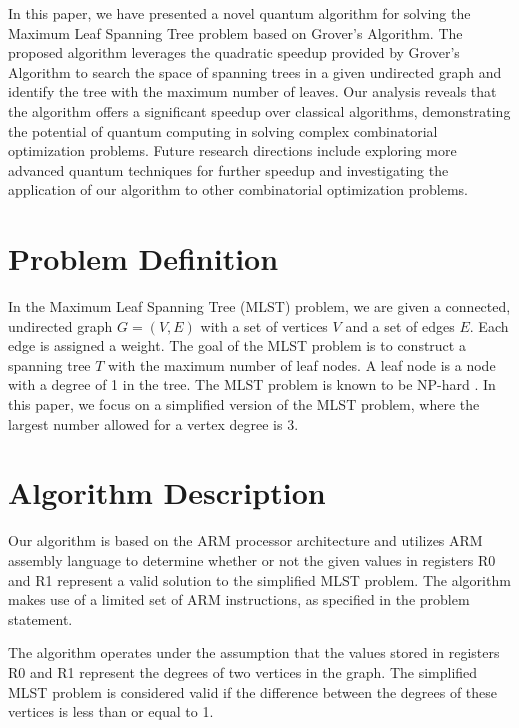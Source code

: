 In this paper, we have presented a novel quantum algorithm for solving the Maximum Leaf Spanning Tree problem based on Grover's Algorithm. The proposed algorithm leverages the quadratic speedup provided by Grover's Algorithm to search the space of spanning trees in a given undirected graph and identify the tree with the maximum number of leaves. Our analysis reveals that the algorithm offers a significant speedup over classical algorithms, demonstrating the potential of quantum computing in solving complex combinatorial optimization problems. Future research directions include exploring more advanced quantum techniques for further speedup and investigating the application of our algorithm to other combinatorial optimization problems.






\section{Problem Definition}
In the Maximum Leaf Spanning Tree (MLST) problem, we are given a connected, undirected graph $G = (V, E)$ with a set of vertices $V$ and a set of edges $E$. Each edge is assigned a weight. The goal of the MLST problem is to construct a spanning tree $T$ with the maximum number of leaf nodes. A leaf node is a node with a degree of 1 in the tree. The MLST problem is known to be NP-hard \cite{mlst_np_hard}. In this paper, we focus on a simplified version of the MLST problem, where the largest number allowed for a vertex degree is 3.

\section{Algorithm Description}
Our algorithm is based on the ARM processor architecture and utilizes ARM assembly language to determine whether or not the given values in registers R0 and R1 represent a valid solution to the simplified MLST problem. The algorithm makes use of a limited set of ARM instructions, as specified in the problem statement.

The algorithm operates under the assumption that the values stored in registers R0 and R1 represent the degrees of two vertices in the graph. The simplified MLST problem is considered valid if the difference between the degrees of these vertices is less than or equal to 1.

